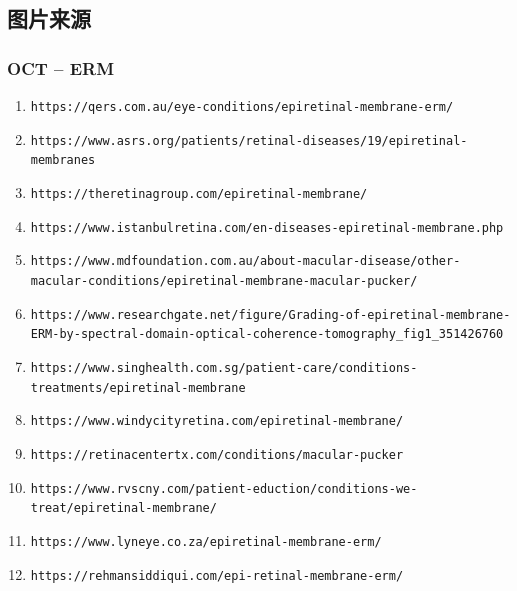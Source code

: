 \documentclass{article}
\begin{document}
	\subsection*{图片来源}
	
	\subsubsection*{OCT -- ERM}
	\vspace{0.5cm}
	
	\begin{enumerate}
		\item \nolinkurl{https://qers.com.au/eye-conditions/epiretinal-membrane-erm/}
		
		\item \nolinkurl{https://www.asrs.org/patients/retinal-diseases/19/epiretinal-membranes}
		
		\item \nolinkurl{https://theretinagroup.com/epiretinal-membrane/}
		
		\item \nolinkurl{https://www.istanbulretina.com/en-diseases-epiretinal-membrane.php}
		
		\item \nolinkurl{https://www.mdfoundation.com.au/about-macular-disease/other-macular-conditions/epiretinal-membrane-macular-pucker/}
		
		\item \nolinkurl{https://www.researchgate.net/figure/Grading-of-epiretinal-membrane-ERM-by-spectral-domain-optical-coherence-tomography_fig1_351426760}
		
		\item \nolinkurl{https://www.singhealth.com.sg/patient-care/conditions-treatments/epiretinal-membrane}
		
		\item \nolinkurl{https://www.windycityretina.com/epiretinal-membrane/}
		
		\item \nolinkurl{https://retinacentertx.com/conditions/macular-pucker}
		
		\item \nolinkurl{https://www.rvscny.com/patient-eduction/conditions-we-treat/epiretinal-membrane/}
		
		\item \nolinkurl{https://www.lyneye.co.za/epiretinal-membrane-erm/}
		
		\item \nolinkurl{https://rehmansiddiqui.com/epi-retinal-membrane-erm/}
		

\end{enumerate}
\end{document}
